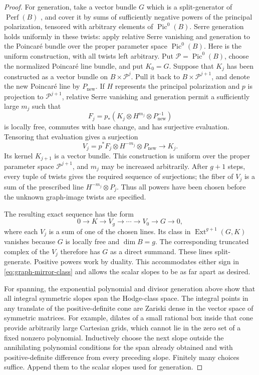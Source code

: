 \documentclass[11pt]{article}
\numberwithin{equation}{section}
\theoremstyle{definition}
\theoremstyle{remark}
\newcommand{\Ext}{\operatorname{Ext}}
\newcommand{\Perf}{\operatorname{Perf}}
\begin{document}
\begin{proof}
For generation, take a vector bundle $G$ which is a split-generator of
$\Perf(B)$ \cite[Section~3.5]{History:ToenVaquie}, and cover it by sums of sufficiently negative powers of
the principal polarization, tensored with arbitrary elements of
$\operatorname{Pic}^0(B)$.  Serre generation holds uniformly in these
twists: apply relative Serre vanishing and generation to the Poincar\'e
bundle over the proper parameter space $\operatorname{Pic}^0(B)$.
Here is the uniform construction, with all twists left arbitrary.
Put $\mathcal P=\operatorname{Pic}^0(B)$, choose the normalized
Poincar\'e line bundle, and put $K_0=G$.  Suppose that $K_j$ has
been constructed as a vector bundle on $B\times\mathcal P^j$.
Pull it back to $B\times\mathcal P^{j+1}$, and denote the new
Poincar\'e line by $P_{\mathrm{new}}$.  If $H$ represents the
principal polarization and $p$ is projection to
$\mathcal P^{j+1}$, relative Serre vanishing and generation
permit a sufficiently large $m_j$ such that
\[
 F_j=p_*(K_j\otimes H^{m_j}\otimes P_{\mathrm{new}}^{-1})
\]
is locally free, commutes with base change, and has surjective
evaluation.  Tensoring that evaluation gives a surjection
\[
 V_j=p^*F_j\otimes H^{-m_j}\otimes P_{\mathrm{new}}
 \longrightarrow K_j.
\]
Its kernel $K_{j+1}$ is a vector bundle.  This construction is
uniform over the proper parameter space $\mathcal P^{j+1}$,
and $m_j$ may be increased arbitrarily.  After $g+1$ steps,
every tuple of twists gives the required sequence of
surjections; the fiber of $V_j$ is a sum of the prescribed
line $H^{-m_j}\otimes P_j$.  Thus all powers have been chosen
before the unknown graph-image twists are specified.

The resulting exact sequence has the form
\[
 0\longrightarrow K\longrightarrow V_g\longrightarrow\cdots
 \longrightarrow V_0\longrightarrow G\longrightarrow0,
\]
where each $V_j$ is a sum of one of the chosen lines.  Its class in
$\Ext^{g+1}(G,K)$ vanishes because $G$ is locally free and $\dim B=g$.
The corresponding truncated complex of the $V_j$ therefore has $G$
as a direct summand.  These lines split-generate.  Positive powers work
by duality.  This accommodates either sign in
\eqref{eq:graph-mirror-class} and allows the scalar slopes to be as
far apart as desired.

For spanning, the exponential polynomial and divisor generation above
show that all integral symmetric slopes span the Hodge-class space.
The integral points in any translate of the positive-definite cone
are Zariski dense in the vector space of symmetric matrices.  For
example, dilates of a small rational box inside that cone provide
arbitrarily large Cartesian grids, which cannot lie in the zero set
of a fixed nonzero polynomial.  Inductively choose the next slope
outside the annihilating polynomial conditions for the span already
obtained and with positive-definite difference from every preceding
slope.  Finitely many choices suffice.  Append them to the scalar
slopes used for generation.
\end{proof}
\end{document}
